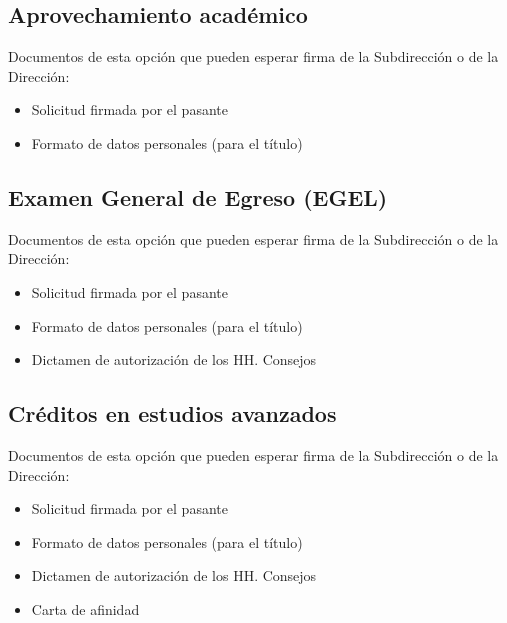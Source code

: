 \subsection{Aprovechamiento académico}
Documentos de esta opción que pueden esperar firma de la Subdirección o de la Dirección:
\begin{itemize}
  \item Solicitud firmada por el pasante
  \item Formato de datos personales (para el título)
\end{itemize}
\subsection{Examen General de Egreso (EGEL)}
Documentos de esta opción que pueden esperar firma de la Subdirección o de la Dirección:
\begin{itemize}
  \item Solicitud firmada por el pasante
  \item Formato de datos personales (para el título)
  \item Dictamen de autorización de los HH. Consejos
\end{itemize}
\subsection{Créditos en estudios avanzados}
Documentos de esta opción que pueden esperar firma de la Subdirección o de la Dirección:
\begin{itemize}
  \item Solicitud firmada por el pasante
  \item Formato de datos personales (para el título)
  \item Dictamen de autorización de los HH. Consejos
  \item Carta de afinidad
\end{itemize}
